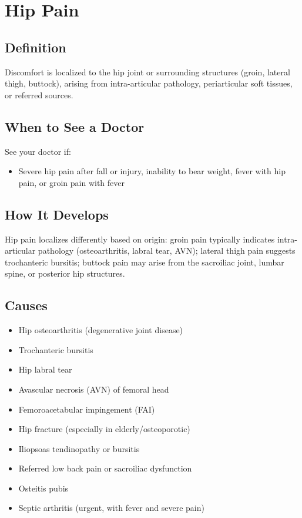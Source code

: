 \chapter{Hip Pain}

\section*{Definition}
Discomfort is localized to the hip joint or surrounding structures (groin, lateral thigh, buttock), arising from intra-articular pathology, periarticular soft tissues, or referred sources.

\section*{When to See a Doctor}
See your doctor if:
\begin{itemize}
  \item Severe hip pain after fall or injury, inability to bear weight, fever with hip pain, or groin pain with fever
\end{itemize}

\section*{How It Develops}
Hip pain localizes differently based on origin: groin pain typically indicates intra-articular pathology (osteoarthritis, labral tear, AVN); lateral thigh pain suggests trochanteric bursitis; buttock pain may arise from the sacroiliac joint, lumbar spine, or posterior hip structures.

\section*{Causes}
\begin{itemize}
  \item Hip osteoarthritis (degenerative joint disease)
  \item Trochanteric bursitis
  \item Hip labral tear
  \item Avascular necrosis (AVN) of femoral head
  \item Femoroacetabular impingement (FAI)
  \item Hip fracture (especially in elderly/osteoporotic)
  \item Iliopsoas tendinopathy or bursitis
  \item Referred low back pain or sacroiliac dysfunction
  \item Osteitis pubis
  \item Septic arthritis (urgent, with fever and severe pain)
\end{itemize}

